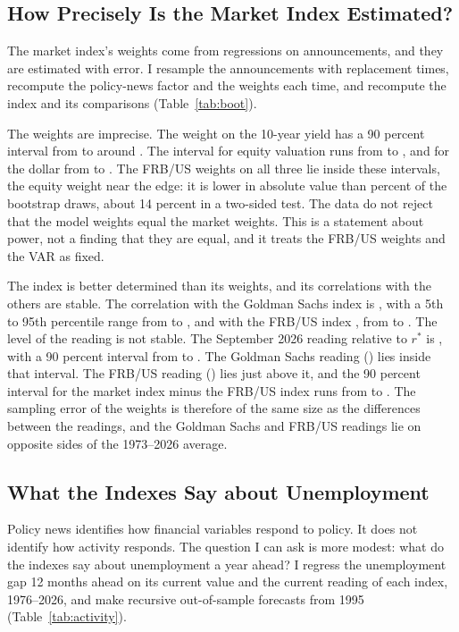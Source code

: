 \documentclass[11pt]{article}
\newcommand{\rs}{r^{*}}
\begin{document}
\subsection{How Precisely Is the Market Index Estimated?}\label{sec:precision}
The market index's weights come from regressions on  announcements, and they are estimated with error. I resample the announcements with replacement  times, recompute the policy-news factor and the weights each time, and recompute the index and its comparisons (Table~\ref{tab:boot}).



The weights are imprecise. The weight on the 10-year yield has a 90 percent interval from  to  around . The interval for equity valuation runs from  to , and for the dollar from  to . The FRB/US weights on all three lie inside these intervals, the equity weight near the edge: it is lower in absolute value than  percent of the bootstrap draws, about 14 percent in a two-sided test. The data do not reject that the model weights equal the market weights. This is a statement about power, not a finding that they are equal, and it treats the FRB/US weights and the VAR as fixed.

The index is better determined than its weights, and its correlations with the others are stable. The correlation with the Goldman Sachs index is , with a 5th to 95th percentile range from  to , and with the FRB/US index , from  to . The level of the reading is not stable. The September 2026 reading relative to $\rs$ is , with a 90 percent interval from  to . The Goldman Sachs reading () lies inside that interval. The FRB/US reading () lies just above it, and the 90 percent interval for the market index minus the FRB/US index runs from  to . The sampling error of the weights is therefore of the same size as the differences between the readings, and the Goldman Sachs and FRB/US readings lie on opposite sides of the 1973--2026 average.

\subsection{What the Indexes Say about Unemployment}\label{sec:activity}
Policy news identifies how financial variables respond to policy. It does not identify how activity responds. The question I can ask is more modest: what do the indexes say about unemployment a year ahead? I regress the unemployment gap 12 months ahead on its current value and the current reading of each index, 1976--2026, and make recursive out-of-sample forecasts from 1995 (Table~\ref{tab:activity}).
\end{document}
